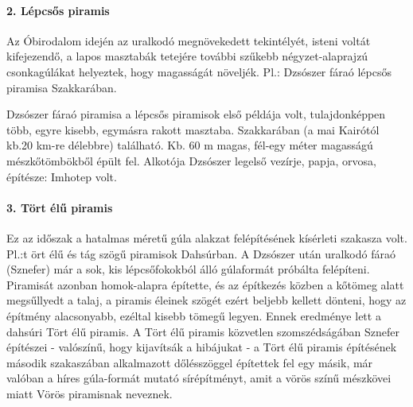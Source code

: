 \paragraph{2. Lépcsős piramis}
Az Óbirodalom idején az uralkodó megnövekedett tekintélyét, isteni voltát kifejezendő, a lapos masztabák tetejére további szűkebb négyzet-alaprajzú csonkagúlákat helyeztek, hogy magasságát növeljék. Pl.: Dzsószer fáraó lépcsős piramisa Szakkarában.

Dzsószer fáraó piramisa a lépcsős piramisok első példája volt, tulajdonképpen több, egyre kisebb, egymásra rakott masztaba. Szakkarában (a mai Kairótól kb.20 km-re délebbre) található. Kb. 60 m magas, fél-egy méter magasságú mészkőtömbökből épült fel. Alkotója Dzsószer legelső vezírje, papja, orvosa, építésze: Imhotep volt.

\begin{figure}
\end{figure}

\paragraph{3. Tört élű piramis}
Ez az időszak a hatalmas méretű gúla alakzat felépítésének kísérleti szakasza volt. Pl.:t ört élű és tág szögű piramisok Dahsúrban.
A Dzsószer után uralkodó fáraó (Sznefer) már a sok, kis lépcsőfokokból álló gúlaformát próbálta felépíteni. Piramisát azonban homok-alapra építette, és az építkezés közben a kőtömeg alatt megsűllyedt a talaj, a piramis éleinek szögét ezért beljebb kellett dönteni, hogy az építmény alacsonyabb, ezéltal kisebb tömegű legyen. Ennek eredménye lett a dahsúri Tört élű piramis.
A Tört élű piramis közvetlen szomszédságában Sznefer építészei - valószínű, hogy kijavítsák a hibájukat - a Tört élű piramis építésének második szakaszában alkalmazott dőlésszöggel építettek fel egy másik, már valóban a híres gúla-formát mutató sírépítményt, amit a vörös színű mészkövei miatt Vörös piramisnak neveznek.


